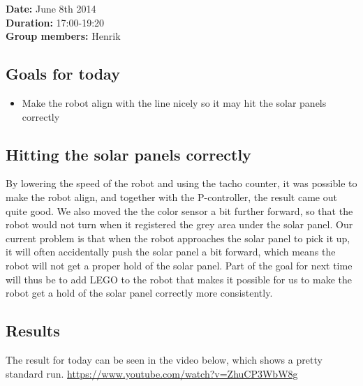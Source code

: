 \textbf{Date:} June 8th 2014\\\textbf{Duration:}
17:00-19:20\\\textbf{Group members:} Henrik

\subsection{Goals for today}

\begin{itemize}
\itemsep1pt\parskip0pt
\item
  Make the robot align with the line nicely so it may hit the solar
  panels correctly
\end{itemize}

\subsection{Hitting the solar panels correctly}

By lowering the speed of the robot and using the tacho counter, it was
possible to make the robot align, and together with the P-controller,
the result came out quite good. We also moved the the color sensor a bit
further forward, so that the robot would not turn when it registered the
grey area under the solar panel. Our current problem is that when the
robot approaches the solar panel to pick it up, it will often
accidentally push the solar panel a bit forward, which means the robot
will not get a proper hold of the solar panel. Part of the goal for next
time will thus be to add LEGO to the robot that makes it possible for us
to make the robot get a hold of the solar panel correctly more
consistently.

\subsection{Results}

The result for today can be seen in the video below, which shows a
pretty standard run. \url{https://www.youtube.com/watch?v=ZhuCP3WbW8g}
